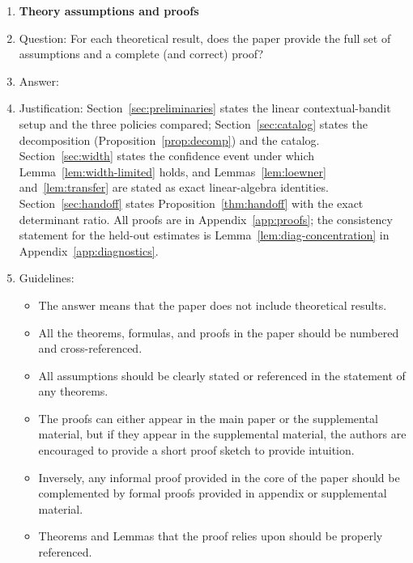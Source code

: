 \documentclass{article}
\theoremstyle{definition}
\theoremstyle{remark}
\theoremstyle{remark}
\begin{document}
\begin{enumerate}
\begin{itemize}
        \item If applicable, the authors should discuss possible limitations of their approach to address problems of privacy and fairness.
        \item While the authors might fear that complete honesty about limitations might be used by reviewers as grounds for rejection, a worse outcome might be that reviewers discover limitations that aren't acknowledged in the paper. The authors should use their best judgment and recognize that individual actions in favor of transparency play an important role in developing norms that preserve the integrity of the community. Reviewers will be specifically instructed to not penalize honesty concerning limitations.
    \end{itemize}

\item {\bf Theory assumptions and proofs}
    \item[] Question: For each theoretical result, does the paper provide the full set of assumptions and a complete (and correct) proof?
    \item[] Answer: \answerYes{} %
    \item[] Justification: Section~\ref{sec:preliminaries} states the linear contextual-bandit setup and the three policies compared; Section~\ref{sec:catalog} states the decomposition (Proposition~\ref{prop:decomp}) and the catalog. Section~\ref{sec:width} states the confidence event under which Lemma~\ref{lem:width-limited} holds, and Lemmas~\ref{lem:loewner} and~\ref{lem:transfer} are stated as exact linear-algebra identities. Section~\ref{sec:handoff} states Proposition~\ref{thm:handoff} with the exact determinant ratio. All proofs are in Appendix~\ref{app:proofs}; the consistency statement for the held-out estimates is Lemma~\ref{lem:diag-concentration} in Appendix~\ref{app:diagnostics}.
    \item[] Guidelines:
    \begin{itemize}
        \item The answer \answerNA{} means that the paper does not include theoretical results. 
        \item All the theorems, formulas, and proofs in the paper should be numbered and cross-referenced.
        \item All assumptions should be clearly stated or referenced in the statement of any theorems.
        \item The proofs can either appear in the main paper or the supplemental material, but if they appear in the supplemental material, the authors are encouraged to provide a short proof sketch to provide intuition. 
        \item Inversely, any informal proof provided in the core of the paper should be complemented by formal proofs provided in appendix or supplemental material.
        \item Theorems and Lemmas that the proof relies upon should be properly referenced. 
    \end{itemize}


\end{enumerate}
\end{document}
